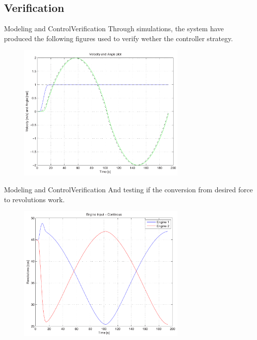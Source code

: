 \documentclass[10pt]{beamer}
\begin{document}
\subsection{Verification}
\begin{frame}{Modeling and Control}{Verification}
Through simulations, the system have produced the following figures used to verify wether the controller strategy.
  	\begin{figure}
			\begin{center}
				\includegraphics[width=8.2cm]{img/reftrack}
				\label{fig:reftrack}
			\end{center}
		\end{figure}
\end{frame}

\begin{frame}{Modeling and Control}{Verification}
And testing if the conversion from desired force to revolutions work. 
  	\begin{figure}
			\begin{center}
				\includegraphics[width=8.2cm]{img/eng_inp}
				\label{fig:eng_inp}
			\end{center}
		\end{figure}
\end{frame}
\end{document}
